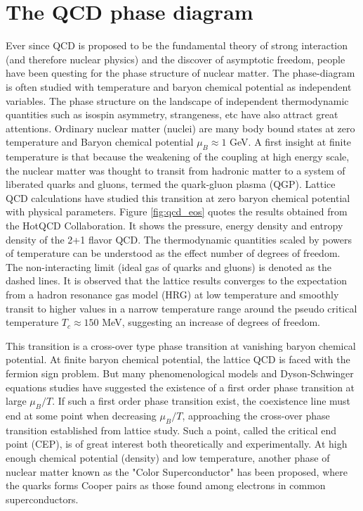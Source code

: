 \section{The QCD phase diagram}
Ever since QCD is proposed to be the fundamental theory of strong interaction (and therefore nuclear physics) and the discover of asymptotic freedom, people have been questing for the phase structure of nuclear matter. 
The phase-diagram is often studied with temperature and baryon chemical potential as independent variables. 
The phase structure on the landscape of independent thermodynamic quantities such as isospin asymmetry, strangeness, etc have also attract great attentions.
Ordinary nuclear matter (nuclei) are many body bound states at zero temperature and Baryon chemical potential $\mu_B\approx 1$ GeV.
A first insight at finite temperature is that because the weakening of the coupling at high energy scale, the nuclear matter was thought to transit from hadronic matter to a system of liberated quarks and gluons, termed the quark-gluon plasma (QGP). 
Lattice QCD calculations have studied this transition at zero baryon chemical potential with physical parameters.
Figure \ref{fig:qcd_eos} quotes the results obtained from the HotQCD Collaboration.
It shows the pressure, energy density and entropy density of the 2+1 flavor QCD.
The thermodynamic quantities scaled by powers of temperature can be understood as the effect number of degrees of freedom.
The non-interacting limit (ideal gas of quarks and gluons) is denoted as the dashed lines. 
It is observed that the lattice results converges to the expectation from a hadron resonance gas model (HRG) at low temperature and smoothly transit to higher values in a narrow temperature range around the pseudo critical temperature $T_c \approx 150 $ MeV, suggesting an increase of degrees of freedom.

This transition is a cross-over type phase transition at vanishing baryon chemical potential.
At finite baryon chemical potential, the lattice QCD is faced with the fermion sign problem. But many phenomenological models and Dyson-Schwinger equations studies have suggested the existence of a first order phase transition at large $\mu_B/T$.
If such a first order phase transition exist, the coexistence line must end at some point when decreasing $\mu_B/T$, approaching the cross-over phase transition established from lattice study.
Such a point, called the critical end point (CEP), is of great interest both theoretically and experimentally.
At high enough chemical potential (density) and low temperature, another phase of nuclear matter known as the "Color Superconductor" has been proposed, where the quarks forms Cooper pairs as those found among electrons in common superconductors.

